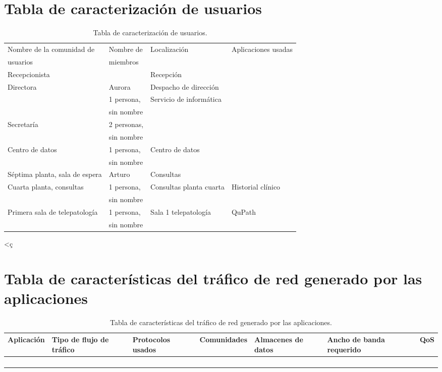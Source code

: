 \section{Tabla de caracterización de usuarios}

\begin{table}[H]
	\begin{center}
		\begin{tabular}{|l|l|l|l|}
			\hline 
			Nombre de la comunidad de & Nombre de & Localización & Aplicaciones usadas \\
		    usuarios & miembros & & \\ 
			\hline \hline
			Recepcionista & & Recepción  & \\ \hline
			Directora & Aurora & Despacho de dirección  & \\ \hline
			 & 1 persona, & Servicio de informática & \\ 
			 & sin nombre & & \\ \hline
		    Secretaría & 2 personas,  & &  \\ 
		     & sin nombre & & \\ \hline
		    Centro de datos & 1 persona, & Centro de datos &  \\ 
		     & sin nombre & & \\ \hline
		    Séptima planta, sala de espera & Arturo  & Consultas &  \\ \hline
		    Cuarta planta, consultas & 1 persona, & Consultas planta cuarta & Historial clínico  \\ 
		    & sin nombre & & \\ \hline
		    Primera sala de telepatología & 1 persona, & Sala 1 telepatología & QuPath \\
		    & sin nombre & & \\ \hline
		\end{tabular}
		\caption{Tabla de caracterización de usuarios.}
		\label{tabla:tabla5}<ç
	\end{center}
\end{table}

\section{Tabla de características del tráfico de red generado por las aplicaciones}

\begin{table}[H]
	\begin{center}
		\begin{tabular}{|l|l|l|l|l|l|l|}
			\hline 
			Aplicación & Tipo de flujo de tráfico & Protocolos usados & Comunidades & Almacenes de datos & Ancho de banda requerido & QoS \\ 
			\hline \hline
			& & & & & & \\ \hline
			& & & & & & \\ \hline
			& & & & & & \\ \hline
			& & & & & &  \\ \hline
		\end{tabular}
		\caption{Tabla de características del tráfico de red generado por las aplicaciones.}
		\label{tabla:tabla6}
	\end{center}
\end{table}

%
%

       
